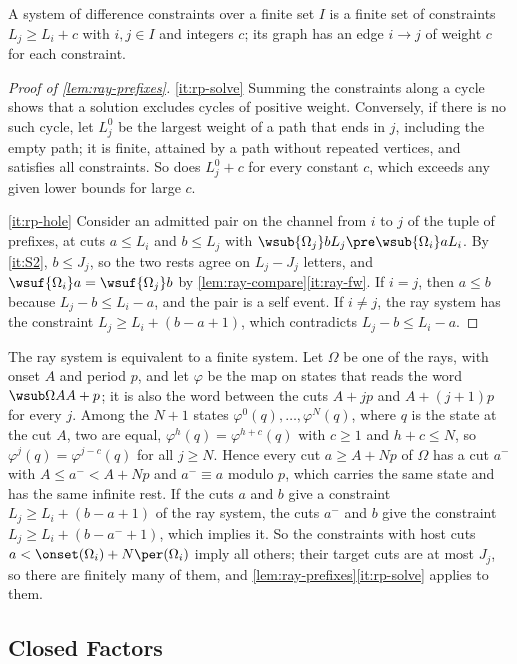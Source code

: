 A system of difference constraints over a finite set $I$ is a finite set of
constraints $L_j\ge L_i+c$ with $i,j\in I$ and integers $c$; its graph has
an edge $i\to j$ of weight $c$ for each constraint.

\begin{proof}[Proof of \cref{lem:ray-prefixes}]
\eqref{it:rp-solve} Summing the constraints along a cycle shows that a
solution excludes cycles of positive weight. Conversely, if there is no such
cycle, let $L^0_j$ be the largest weight of a path that ends in $j$,
including the empty path; it is finite, attained by a path without repeated
vertices, and satisfies all constraints. So does $L^0_j+c$ for every
constant $c$, which exceeds any given lower bounds for large $c$.

\eqref{it:rp-hole} Consider an admitted pair on the channel from $i$
to $j$ of the tuple of prefixes, at cuts $a\le L_i$ and $b\le L_j$ with
$\wsub{\Omega_j}b{L_j}\pre\wsub{\Omega_i}a{L_i}$. By \ref{it:S2}, $b\le
J_j$, so the two rests agree on $L_j-J_j$ letters, and
$\wsuf{\Omega_i}a=\wsuf{\Omega_j}b$ by
\cref{lem:ray-compare}\eqref{it:ray-fw}. If $i=j$, then $a\le b$ because
$L_j-b\le L_i-a$, and the pair is a self event. If $i\ne j$, the ray system
has the constraint $L_j\ge L_i+(b-a+1)$, which contradicts $L_j-b\le L_i-a$.
\end{proof}

The ray system is equivalent to a finite system. Let $\Omega$ be one of the
rays, with onset $A$ and period $p$, and let $\varphi$ be the map on states
that reads the word $\wsub\Omega A{A+p}$; it is also the word between the
cuts $A+jp$ and $A+(j+1)p$ for every $j$. Among the $N+1$ states
$\varphi^0(q),\dots,\varphi^N(q)$, where $q$ is the state at the cut $A$, two
are equal, $\varphi^{h}(q)=\varphi^{h+c}(q)$ with $c\ge1$ and $h+c\le N$, so
$\varphi^j(q)=\varphi^{j-c}(q)$ for all $j\ge N$. Hence every cut $a\ge
A+Np$ of $\Omega$ has a cut $a^-$ with $A\le a^-<A+Np$ and $a^-\equiv a$
modulo $p$, which carries the same state and has the same infinite rest. If
the cuts $a$ and $b$ give a constraint $L_j\ge L_i+(b-a+1)$ of the ray system,
the cuts $a^-$ and $b$ give the constraint $L_j\ge L_i+(b-a^-+1)$, which
implies it. So the constraints with host cuts $a<\onset(\Omega_i)+
N\per(\Omega_i)$ imply all others; their target cuts are at most $J_j$, so
there are finitely many of them, and \cref{lem:ray-prefixes}\eqref{it:rp-solve}
applies to them.

\subsection{Closed Factors}\label{app:tails-closed}

